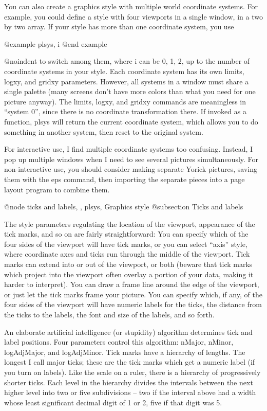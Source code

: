 You can also create a graphics style with multiple world coordinate
systems.  For example, you could define a style with four viewports
in a single window, in a two by two array.  If your style has more
than one coordinate system, you use

@example
plsys, i
@end example

@noindent
to switch among them, where i can be 0, 1, 2, up to the number of
coordinate systems in your style.  Each coordinate system has its own
limits, logxy, and gridxy parameters.  However, all systems in a
window must share a single palette (many screens don't have more
colors than what you need for one picture anyway).  The limits, logxy,
and gridxy commands are meaningless in ``system 0'', since there is no
coordinate transformation there.  If invoked as a function, plsys will
return the current coordinate system, which allows you to do something
in another system, then reset to the original system.

For interactive use, I find multiple coordinate systems too confusing.
Instead, I pop up multiple windows when I need to see several pictures
simultaneously.  For non-interactive use, you should consider making
separate Yorick pictures, saving them with the eps command, then
importing the separate pieces into a page layout program to combine
them.

@node ticks and labels,  , plsys, Graphics style
@subsection Ticks and labels

The style parameters regulating the location of the viewport,
appearance of the tick marks, and so on are fairly straightforward:
You can specify which of the four sides of the viewport will have
tick marks, or you can select ``axis'' style, where coordinate axes
and ticks run through the middle of the viewport.  Tick marks can
extend into or out of the viewport, or both (beware that tick marks
which project into the viewport often overlay a portion of your data,
making it harder to interpret).  You can draw a frame line around the
edge of the viewport, or just let the tick marks frame your picture.
You can specify which, if any, of the four sides of the viewport will
have numeric labels for the ticks, the distance from the ticks to the
labels, the font and size of the labels, and so forth.

An elaborate artificial intelligence (or stupidity) algorithm
determines tick and label positions.  Four parameters control this
algorithm: nMajor, nMinor, logAdjMajor, and logAdjMinor.  Tick marks
have a hierarchy of lengths.  The longest I call major ticks; these
are the tick marks which get a numeric label (if you turn on labels).
Like the scale on a ruler, there is a hierarchy of progressively
shorter ticks.  Each level in the hierarchy divides the intervals
between the next higher level into two or five subdivisions -- two if
the interval above had a width whose least significant decimal digit
of 1 or 2, five if that digit was 5.

